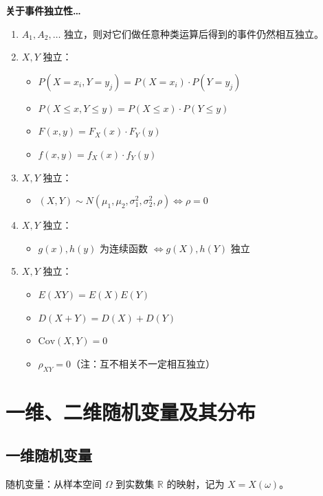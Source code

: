 \documentclass[UTF8]{ctexart}
\newcommand\Concept[1]{\textcolor{cyan!70!black}{#1}}
\newcommand\Cov{\mathrm{Cov}}
\begin{document}
\begin{mybox}
\textbf{关于事件独立性…}
\begin{enumerate}
    \item $A_1,A_2,\dots$ 独立，则对它们做任意种类运算后得到的事件仍然相互独立。
    \item $X,Y$ 独立：
    \begin{itemize}[itemsep=0pt,parsep=0pt]
        \item $P(X=x_i,Y=y_j) = P(X=x_i)\cdot P(Y=y_j)$
        \item $P(X\leqslant x, Y\leqslant y) = P(X\leqslant x)\cdot P(Y\leqslant y)$
        \item $F(x,y) = F_X(x)\cdot F_Y(y)$
        \item $f(x,y) = f_X(x)\cdot f_Y(y)$
    \end{itemize}
    \item $X,Y$ 独立：
    \begin{itemize}[itemsep=0pt,parsep=0pt]
        \item $(X,Y)\sim N(\mu_1, \mu_2,\sigma_1^2, \sigma_2^2,\rho) \iff \rho=0$
    \end{itemize}
    \item $X,Y$ 独立：
    \begin{itemize}[itemsep=0pt,parsep=0pt]
        \item $g(x),h(y)$ 为连续函数 $\iff g(X),h(Y)$ 独立
    \end{itemize}
    \item $X,Y$ 独立：
    \begin{itemize}[itemsep=0pt,parsep=0pt]
        \item $E(XY)=E(X)E(Y)$
        \item $D(X+Y)=D(X)+D(Y)$
        \item $\Cov(X,Y)=0$
        \item $\rho_{XY}=0$（注：互不相关不一定相互独立）
    \end{itemize}
\end{enumerate}
\end{mybox}

\section{一维、二维随机变量及其分布}
\subsection{一维随机变量}
\Concept{随机变量}：从样本空间 $\varOmega$ 到实数集 $\mathbb{R}$ 的映射，记为 $X=X(\omega)$。
\end{document}
